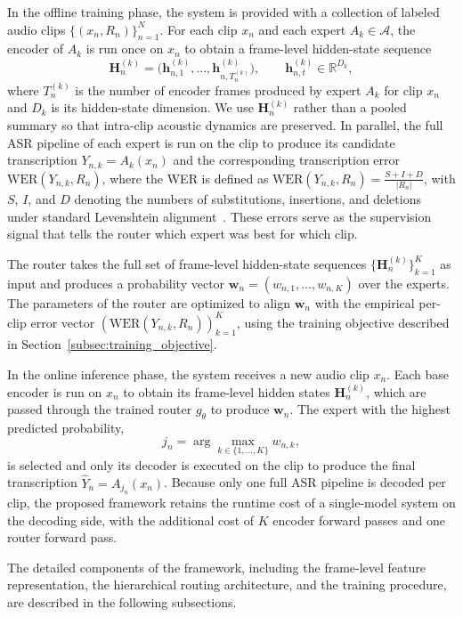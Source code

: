 \documentclass[journal]{IEEEtran}
\begin{document}
In the offline training phase, the system is provided with a
collection of labeled audio clips $\{(x_n,R_n)\}_{n=1}^{N}$. For each
clip $x_n$ and each expert $A_k\in\mathcal{A}$, the encoder of $A_k$
is run once on $x_n$ to obtain a frame-level hidden-state sequence
\[
\mathbf{H}_n^{(k)}=
\bigl(\mathbf{h}_{n,1}^{(k)},\dots,\mathbf{h}_{n,T_n^{(k)}}^{(k)}\bigr),
\qquad
\mathbf{h}_{n,t}^{(k)}\in\mathbb{R}^{D_k},
\]
where $T_n^{(k)}$ is the number of encoder frames produced by expert
$A_k$ for clip $x_n$ and $D_k$ is its hidden-state dimension. We use
$\mathbf{H}_n^{(k)}$ rather than a pooled summary so that intra-clip
acoustic dynamics are preserved. In parallel, the full ASR pipeline of
each expert is run on the clip to produce its candidate transcription
$Y_{n,k}=A_k(x_n)$ and the corresponding transcription error
$\mathrm{WER}(Y_{n,k},R_n)$, where the WER is defined as $\mathrm{WER}(Y_{n,k},R_n)=\frac{S+I+D}{|R_n|}$,
with $S$, $I$, and $D$ denoting the numbers of substitutions, insertions, and deletions under standard Levenshtein alignment~\cite{li2014overviewrobust}. These errors serve as the supervision
signal that tells the router which expert was best for which clip.

The router takes the full set of frame-level hidden-state sequences
$\{\mathbf{H}_n^{(k)}\}_{k=1}^{K}$ as input and produces a probability
vector $\mathbf{w}_n=(w_{n,1},\dots,w_{n,K})$ over the experts. The
parameters of the router are optimized to align $\mathbf{w}_n$ with
the empirical per-clip error vector $(\mathrm{WER}(Y_{n,k},R_n))_{k=1}^{K}$,
using the training objective described in
Section~\ref{subsec:training_objective}.

In the online inference phase, the system receives a new audio clip
$x_n$. Each base encoder is run on $x_n$ to obtain its frame-level
hidden states $\mathbf{H}_n^{(k)}$, which are passed through the
trained router $g_\theta$ to produce $\mathbf{w}_n$. The expert with
the highest predicted probability,
\[
j_n=\arg\max_{k\in\{1,\dots,K\}} w_{n,k},
\]
is selected and only its decoder is executed on the clip to produce
the final transcription $\hat{Y}_n = A_{j_n}(x_n)$. Because only one
full ASR pipeline is decoded per clip, the proposed framework retains
the runtime cost of a single-model system on the decoding side, with
the additional cost of $K$ encoder forward passes and one router
forward pass.

The detailed components of the framework, including the frame-level
feature representation, the hierarchical routing architecture, and
the training procedure, are described in the following subsections.
\end{document}
